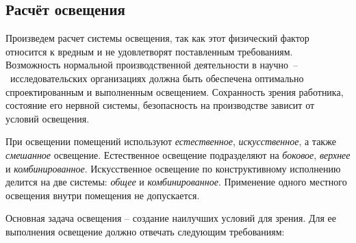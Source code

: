 \newpage
\subsection{Расчёт освещения}

Произведем расчет системы освещения, так как этот физический фактор относится
к вредным и не удовлетворят поставленным требованиям. Возможность нормальной
производственной деятельности в научно~--~исследовательских организациях должна быть
обеспечена оптимально спроектированным и выполненным освещением. Сохранность зрения
работника, состояние его нервной системы, безопасность на производстве зависит от
условий освещения.

При освещении помещений используют \textit{естественное}, \textit{искусственное},
а также \textit{смешанное} освещение.
Естественное освещение подразделяют на \textit{боковое}, \textit{верхнее} и
\textit{комбинированное}.
Искусственное освещение по конструктивному исполнению делится на две системы:
\textit{общее} и \textit{комбинированное}. Применение одного местного освещения
внутри помещения не допускается.

Основная задача освещения – создание наилучших условий для зрения. Для ее
выполнения освещение должно отвечать следующим требованиям:

